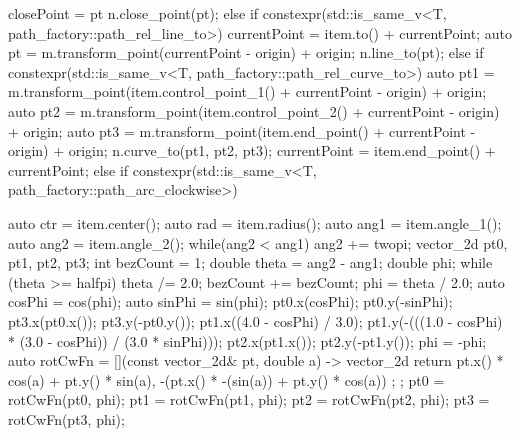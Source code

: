\begin{codeblock}
{{{        closePoint = pt    
        n.close_point(pt);
      }
      else if constexpr(std::is_same_v<T, path_factory::path_rel_line_to>) {
        currentPoint = item.to() + currentPoint;
        auto pt = m.transform_point(currentPoint - origin) + origin;
        n.line_to(pt);
      }
      else if constexpr(std::is_same_v<T, path_factory::path_rel_curve_to>) {
        auto pt1 = m.transform_point(item.control_point_1() + currentPoint -
        origin) + origin;
        auto pt2 = m.transform_point(item.control_point_2() + currentPoint -
        origin) + origin;
        auto pt3 = m.transform_point(item.end_point() + currentPoint - origin) +
        origin;
        n.curve_to(pt1, pt2, pt3);
        currentPoint = item.end_point() + currentPoint;
      }
      else if constexpr(std::is_same_v<T, path_factory::path_arc_clockwise>) {
        auto ctr = item.center();
        auto rad = item.radius();
        auto ang1 = item.angle_1();
        auto ang2 = item.angle_2();
        while(ang2 < ang1) {
          ang2 += twopi;
        }
        vector_2d pt0, pt1, pt2, pt3;
        int bezCount = 1;
        double theta = ang2 - ang1;
        double phi;
        while (theta >= halfpi) {
          theta /= 2.0;
          bezCount += bezCount;
        }
        phi = theta / 2.0;
        auto cosPhi = cos(phi);
        auto sinPhi = sin(phi);
        pt0.x(cosPhi);
        pt0.y(-sinPhi);
        pt3.x(pt0.x());
        pt3.y(-pt0.y());
        pt1.x((4.0 - cosPhi) / 3.0);
        pt1.y(-(((1.0 - cosPhi) * (3.0 - cosPhi)) / (3.0 * sinPhi)));
        pt2.x(pt1.x());
        pt2.y(-pt1.y());
        phi = -phi;
        auto rotCwFn = [](const vector_2d& pt, double a) -> vector_2d {
          return { pt.x() * cos(a) + pt.y() * sin(a),
            -(pt.x() * -(sin(a)) + pt.y() * cos(a)) };
        };
        pt0 = rotCwFn(pt0, phi);
        pt1 = rotCwFn(pt1, phi);
        pt2 = rotCwFn(pt2, phi);
        pt3 = rotCwFn(pt3, phi);
        
}}}
\end{codeblock}
